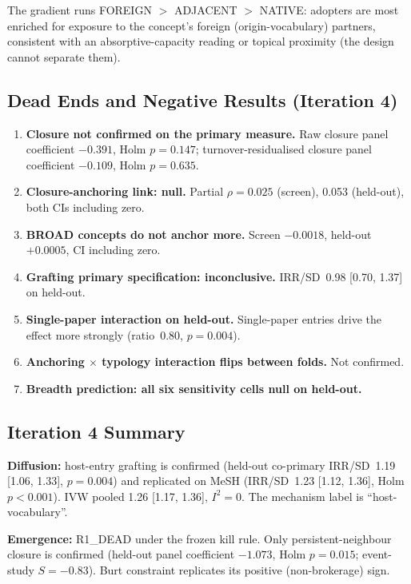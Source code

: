 \documentclass[11pt,letterpaper]{article}
\begin{document}
The gradient runs FOREIGN $>$ ADJACENT $>$ NATIVE: adopters are most enriched for exposure to the concept's foreign (origin-vocabulary) partners, consistent with an absorptive-capacity reading or topical proximity (the design cannot separate them).

\subsection{Dead Ends and Negative Results (Iteration 4)}

\begin{enumerate}
\item \textbf{Closure not confirmed on the primary measure.} Raw closure panel coefficient $-0.391$, Holm $p = 0.147$; turnover-residualised closure panel coefficient $-0.109$, Holm $p = 0.635$.
\item \textbf{Closure-anchoring link: null.} Partial $\rho = 0.025$ (screen), 0.053 (held-out), both CIs including zero.
\item \textbf{BROAD concepts do not anchor more.} Screen $-0.0018$, held-out $+0.0005$, CI including zero.
\item \textbf{Grafting primary specification: inconclusive.} IRR/SD~0.98 [0.70, 1.37] on held-out.
\item \textbf{Single-paper interaction on held-out.} Single-paper entries drive the effect more strongly (ratio~0.80, $p = 0.004$).
\item \textbf{Anchoring $\times$ typology interaction flips between folds.} Not confirmed.
\item \textbf{Breadth prediction: all six sensitivity cells null on held-out.}
\end{enumerate}

\subsection{Iteration 4 Summary}

\textbf{Diffusion:} host-entry grafting is confirmed (held-out co-primary IRR/SD~1.19 [1.06, 1.33], $p = 0.004$) and replicated on MeSH (IRR/SD~1.23 [1.12, 1.36], Holm $p < 0.001$). IVW pooled 1.26 [1.17, 1.36], $I^2 = 0$. The mechanism label is ``host-vocabulary''.

\textbf{Emergence:} R1\_DEAD under the frozen kill rule. Only persistent-neighbour closure is confirmed (held-out panel coefficient $-1.073$, Holm $p = 0.015$; event-study $S = -0.83$). Burt constraint replicates its positive (non-brokerage) sign.
\end{document}
